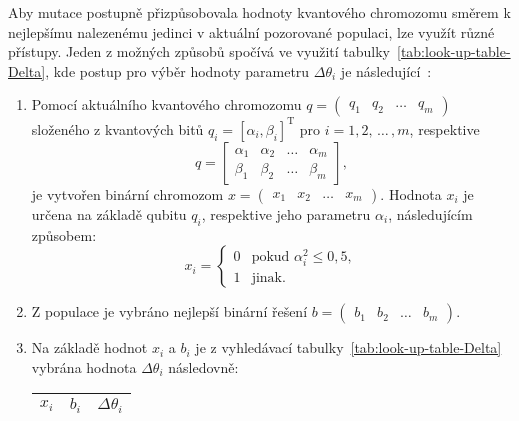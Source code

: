 Aby mutace postupně přizpůsobovala hodnoty kvantového chromozomu směrem k nejlepšímu nalezenému jedinci v aktuální pozorované populaci, lze využít různé přístupy. 
Jeden z možných způsobů spočívá ve využití tabulky~\ref{tab:look-up-table-Delta}, kde postup pro výběr hodnoty parametru $\Delta\theta_i$ je následující~\cite{NaturalComputing}:
\begin{enumerate}
    \item Pomocí aktuálního kvantového chromozomu $q = \begin{pmatrix} q_1 & q_2 & \dots & q_m \end{pmatrix}$ složeného z kvantových bitů $ q_i = \left[ \alpha_i, \beta_i \right]^\text{T}$ pro $i=1,2,\,\dots\,,m$, respektive
        \begin{equation*}
            q =
            \begin{bmatrix}
                \alpha_1 & \alpha_2 & \dots & \alpha_m \\
                \beta_1  & \beta_2  & \dots & \beta_m
            \end{bmatrix},
        \end{equation*}
        je vytvořen binární chromozom $x = \begin{pmatrix} x_1 & x_2 & \dots & x_m \end{pmatrix}$.
        Hodnota $x_i$ je určena na základě qubitu $q_i$, respektive jeho parametru $\alpha_i$, následujícím způsobem:
        \begin{equation*}
            x_i =
            \begin{cases} 
                0 & \text{pokud } \alpha_i^2 \leq 0{,}5, \\
                1 & \text{jinak}.
            \end{cases}
        \end{equation*}
    \item Z populace je vybráno nejlepší binární řešení $b = \begin{pmatrix} b_1 & b_2 & \dots & b_m \end{pmatrix}$.
    \item Na základě hodnot $x_i$ a $b_i$ je z vyhledávací tabulky~\ref{tab:look-up-table-Delta} vybrána hodnota $\Delta\theta_i$ následovně:
        \begin{table}[ht!]
            \centering
            \begin{tabular}{|c c|c|}
            \hline
            $x_i$ & $b_i$ & $\Delta\theta_i$ \\
            \hline

\end{tabular}
\end{table}
\end{enumerate}
